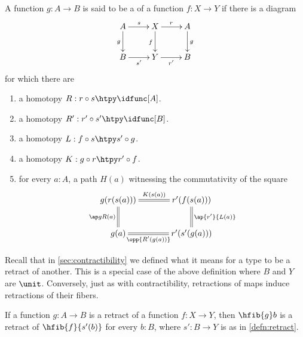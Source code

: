 %

\begin{defn}\label{defn:retract}
A function $g:A\to B$ is said to be a 
of a function $f:X\to Y$ if there is a diagram
\begin{equation*}
  \xymatrix{
    {A} \ar[r]^{s} \ar[d]_{g}
    &
    {X} \ar[r]^{r} \ar[d]_{f}
    &
    {A} \ar[d]^{g}
    \\
    {B} \ar[r]_{s'}
    &
    {Y} \ar[r]_{r'}
    &
    {B}
  }
\end{equation*}
for which there are
\begin{enumerate}
\item a homotopy $R:r\circ s \htpy \idfunc[A]$.
\item a homotopy $R':r'\circ s' \htpy\idfunc[B]$.
\item a homotopy $L:f\circ s\htpy s'\circ g$.
\item a homotopy $K:g\circ r\htpy r'\circ f$.
\item for every $a:A$, a path $H(a)$ witnessing the commutativity of the square
\begin{equation*}
  \xymatrix@C=3pc{
    {g(r(s(a)))} \ar@{=}[r]^-{K(s(a))} \ar@{=}[d]_{\ap g{R(a)}}
    &
    {r'(f(s(a)))} \ar@{=}[d]^{\ap{r'}{L(a)}}
    \\
    {g(a)} \ar@{=}[r]_-{\opp{R'(g(a))}}
    &
    {r'(s'(g(a)))}
  }
\end{equation*}
\end{enumerate}
\end{defn}

Recall that in \cref{sec:contractibility} we defined what it means for a type to be a retract of another.
This is a special case of the above definition where $B$ and $Y$ are $\unit$.
Conversely, just as with contractibility, retractions of maps induce retractions of their fibers.

\begin{lem}\label{lem:func_retract_to_fiber_retract}
If a function $g:A\to B$ is a retract of a function $f:X\to Y$, then $\hfib{g}b$ is a retract of $\hfib{f}{s'(b)}$
for every $b:B$, where $s':B\to Y$ is as in \cref{defn:retract}.
\end{lem}

